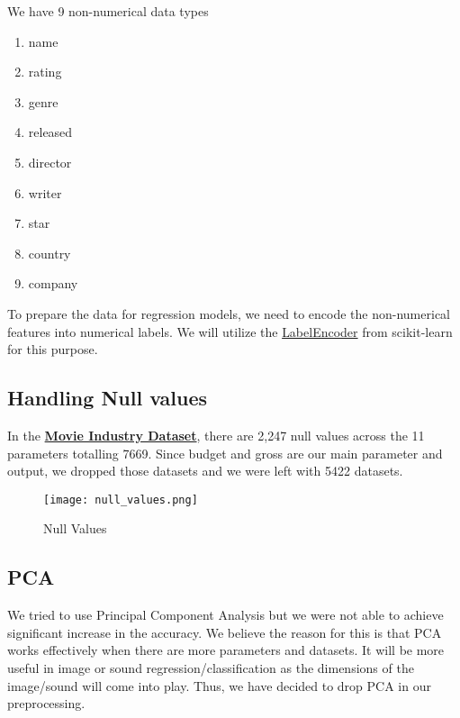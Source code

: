 \documentclass[conference]{IEEEtran}
\begin{document}
        We have 9 non-numerical data types
        \begin{enumerate}
            \item name
            \item rating
            \item genre
            \item released
            \item director
            \item writer
            \item star
            \item country
            \item company
        \end{enumerate}

        To prepare the data for regression models, we need to encode the non-numerical features into numerical labels. We will utilize the \href{https://scikit-learn.org/stable/modules/generated/sklearn.preprocessing.LabelEncoder.html}{LabelEncoder} from scikit-learn for this purpose.

        \subsection{Handling Null values}
            In the \href{https://www.kaggle.com/datasets/danielgrijalvas/movies}{\textbf{Movie Industry Dataset}}, there are 2,247 null values across the 11 parameters totalling 7669.
            Since budget and gross are our main parameter and output, we dropped those datasets and we were left with 5422 datasets.

            \begin{figure}
                \centering \texttt{[image: null\_values.png]}
                \caption{Null Values}
                \label{fig:null-values}
            \end{figure}

        \subsection{PCA}
            We tried to use Principal Component Analysis but we were not able to achieve significant increase in the accuracy.
            We believe the reason for this is that PCA works effectively when there are more parameters and datasets.
            It will be more useful in image or sound regression/classification as the dimensions of the image/sound will come into play.
            Thus, we have decided to drop PCA in our preprocessing.
\end{document}
